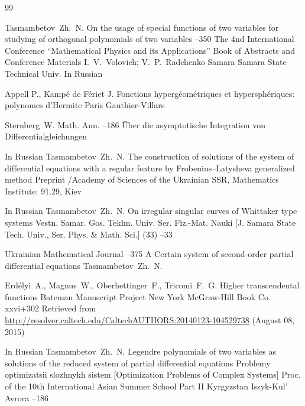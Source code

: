 \begin{thebibliography}{99}

\by  Tasmambetov~Zh.~N. 
\paper On the usage of special functions of two variables for studying of orthogonal polynomials of two variables
--350
\inbook  The 4nd International Conference ``Mathematical Physics and its Applications''
\bookinfo Book of Abstracts and Conference Materials
\eds I.~V.~Volovich; V.~P.~Radchenko
\publaddr Samara
\publ Samara State Technical Univ.
\lang In Russian



\by Appell P., Kamp\'e de F\'eriet J.
\book Fonctions hyperg\'eom\'etriques et hypersph\'eriques: polynomes d'Hermite
\publaddr Paris
\publ Gauthier-Villars

\by Sternberg~W. 
\jour Math. Ann.
--186
\paper \"Uber die asymptotische Integration von Differentialgleichungen


\lang In Russian
\by Tasmambetov~Zh.~N.
\preprint The construction of solutions of the system of differential equations with a regular feature by Frobenius–Latysheva generalized method
\preprintinfo Preprint /Academy of Sciences of the Ukrainian SSR, Mathematics Institute: 91.29, Kiev



\lang In Russian
\by Tasmambetov~Zh.~N.
\paper On irregular singular curves of Whittaker type systems
\jour Vestn. Samar. Gos. Tekhn. Univ. Ser. Fiz.-Mat. Nauki \rm [J. Samara State Tech. Univ., Ser. Phys. \& Math. Sci.]
(33)
--33

\jour Ukrainian Mathematical Journal
--375
\paper A Certain system of second-order partial differential equations
\by Tasmambetov~Zh.~N. 


\by Erd\'elyi~A., Magnus~W., Oberhettinger~F., Tricomi~F.~G.
\book Higher transcendental functions
\serial Bateman Manuscript Project
\publaddr New York
\publ McGraw-Hill Book Co. 
\totalpages xxvi+302 
\elink Retrieved from  \url{http://resolver.caltech.edu/CaltechAUTHORS:20140123-104529738} (August 08, 2015)

\lang In Russian
\by Tasmambetov~Zh.~N.
\paper Legendre polynomials of two variables as solutions of the reduced system of partial differential equations
\inbook Problemy optimizatsii slozhnykh sistem [Optimization Problems of Complex Systems]
\bookinfo Proc. of the 10th International Asian Summer School
\volinfo Part II 
\publaddr Kyrgyzstan 
\publ Issyk-Kul' Avrora 
--186



\end{thebibliography}

